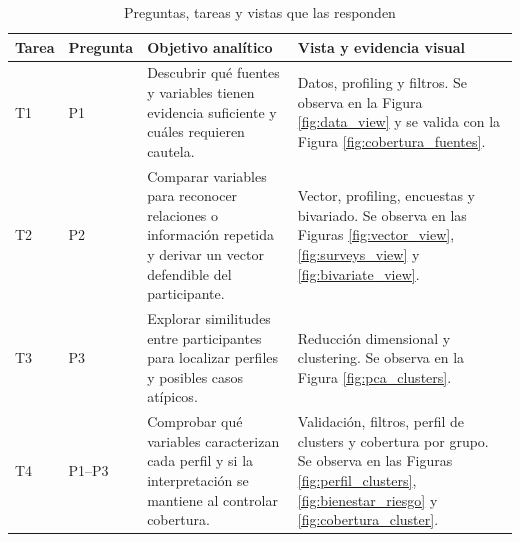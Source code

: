 \documentclass[12pt,a4paper]{article}
\begin{document}
\begin{table}[H]
\centering
\caption{Preguntas, tareas y vistas que las responden}
\footnotesize
\renewcommand{\arraystretch}{1.15}
\begin{tabularx}{\textwidth}{p{0.8cm} p{2.1cm} X p{4.1cm}}
\toprule
\textbf{Tarea} & \textbf{Pregunta} & \textbf{Objetivo anal\'itico} & \textbf{Vista y evidencia visual} \\
\midrule
T1 & P1 & Descubrir qu\'e fuentes y variables tienen evidencia suficiente y cu\'ales requieren cautela. & Datos, profiling y filtros. Se observa en la Figura \ref{fig:data_view} y se valida con la Figura \ref{fig:cobertura_fuentes}. \\
T2 & P2 & Comparar variables para reconocer relaciones o informaci\'on repetida y derivar un vector defendible del participante. & Vector, profiling, encuestas y bivariado. Se observa en las Figuras \ref{fig:vector_view}, \ref{fig:surveys_view} y \ref{fig:bivariate_view}. \\
T3 & P3 & Explorar similitudes entre participantes para localizar perfiles y posibles casos at\'ipicos. & Reducci\'on dimensional y clustering. Se observa en la Figura \ref{fig:pca_clusters}. \\
T4 & P1--P3 & Comprobar qu\'e variables caracterizan cada perfil y si la interpretaci\'on se mantiene al controlar cobertura. & Validaci\'on, filtros, perfil de clusters y cobertura por grupo. Se observa en las Figuras \ref{fig:perfil_clusters}, \ref{fig:bienestar_riesgo} y \ref{fig:cobertura_cluster}. \\
\bottomrule
\end{tabularx}
\renewcommand{\arraystretch}{1}
\end{table}
\end{document}
